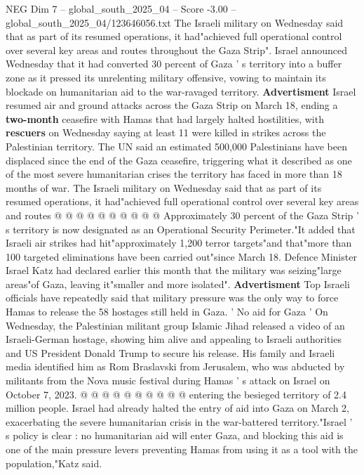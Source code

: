 \begin{textsample}{NEG Dim 7 – global\_south\_2025\_04 – Score -3.00 – global\_south\_2025\_04/123646056.txt}  \label{ex:f7_neg_041}
The Israeli military on Wednesday said that as part of its resumed operations, it had"achieved full operational control over several key areas and routes throughout the Gaza Strip".
Israel announced Wednesday that it had converted 30 percent of Gaza ' s territory into a buffer zone as it pressed its unrelenting military offensive, vowing to maintain its blockade on humanitarian aid to the war-ravaged territory. \textbf{Advertisment} Israel resumed air and ground attacks across the Gaza Strip on March 18, ending a \textbf{two-month} ceasefire with Hamas that had largely halted hostilities, with \textbf{rescuers} on Wednesday saying at least 11 were killed in strikes across the Palestinian territory.
The UN said an estimated 500,000 Palestinians have been displaced since the end of the Gaza ceasefire, triggering what it described as one of the most severe humanitarian crises the territory has faced in more than 18 months of war.
The Israeli military on Wednesday said that as part of its resumed operations, it had"achieved full operational control over several key areas and routes @ @ @ @ @ @ @ @ @ @ Approximately 30 percent of the Gaza Strip ' s territory is now designated as an Operational Security Perimeter."It added that Israeli air strikes had hit"approximately 1,200 terror targets"and that"more than 100 targeted eliminations have been carried out"since March 18.
Defence Minister Israel Katz had declared earlier this month that the military was seizing"large areas"of Gaza, leaving it"smaller and more isolated". \textbf{Advertisment} Top Israeli officials have repeatedly said that military pressure was the only way to force Hamas to release the 58 hostages still held in Gaza. ' No aid for Gaza ' On Wednesday, the Palestinian militant group Islamic Jihad released a video of an Israeli-German hostage, showing him alive and appealing to Israeli authorities and US President Donald Trump to secure his release.
His family and Israeli media identified him as Rom Braslavski from Jerusalem, who was abducted by militants from the Nova music festival during Hamas ' s attack on Israel on October 7, 2023. @ @ @ @ @ @ @ @ @ @ entering the besieged territory of 2.4 million people.
Israel had already halted the entry of aid into Gaza on March 2, exacerbating the severe humanitarian crisis in the war-battered territory."Israel ' s policy is clear : no humanitarian aid will enter Gaza, and blocking this aid is one of the main pressure levers preventing Hamas from using it as a tool with the population,"Katz said.

\end{textsample}

